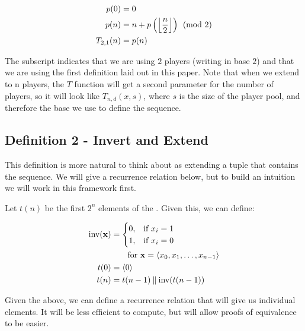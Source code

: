 \documentclass[conference]{IEEEtran}
\begin{document}
\begin{equation}
    \label{eq:p2d01}
    \begin{aligned}
      p(0) &= 0 \\
      p(n) &= n + p\left(\floor{\dfrac{n}{2}}\right) \pmod{2} \\
T_{2,1}(n) &= p(n)
    \end{aligned}
\end{equation}

The subscript indicates that we are using $2$ players (writing in base $2$) and that we are using the first definition laid out in this paper. Note that when we extend to n players, the $T$ function will get a second parameter for the number of players, so it will look like $T_{n,d}(x, s)$, where $s$ is the size of the player pool, and therefore the base we use to define the sequence.

\subsection{Definition 2 - Invert and Extend}


This definition is more natural to think about as extending a tuple that contains the sequence. We will give a recurrence relation below, but to build an intuition we will work in this framework first.

Let $t(n)$ be the first $2^n$ elements of the \TMS. Given this, we can define:

\begin{equation}
\begin{aligned}
\text{inv}(\mathbf{x}) &= \begin{cases}
        0, & \text{if } x_i = 1 \\
        1, & \text{if } x_i = 0
    \end{cases} \\
    &\quad\quad\text{for } \mathbf{x} = \langle x_0, x_1, \ldots, x_{n-1} \rangle \\
                  t(0) &= \langle 0 \rangle \\
                  t(n) &= t(n - 1) \mathbin{\|} \text{inv}(t(n - 1))
    \end{aligned}
\end{equation}

Given the above, we can define a recurrence relation that will give us individual elements. It will be less efficient to compute, but will allow proofs of equivalence to be easier.
\end{document}
